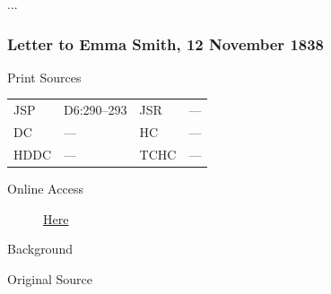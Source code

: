 					\begin{tightright}
					...
					\end{tightright}
					
		\subsubsection{Letter to Emma Smith, 12 November 1838}
			\label{EMS-1838-JS-12-NOV-1838}
			
			\begin{description}
					\item[Print Sources]
				\end{description}

					\begin{tabular}{p{0.5in}p{1in}p{0.5in}p{1in}}
					JSP	 	& D6:290--293		& JSR 		& --- \\
					DC	 	& ---		& HC 		& --- \\
					HDDC 	& ---		& TCHC 		& --- \\
					\end{tabular}
				
				\begin{description}
					\item[Online Access] \href{https://www.josephsmithpapers.org/paper-summary/letter-to-emma-smith-12-november-1838/1}{Here}
				\end{description}
				
				\begin{description}
					\item[Background]
				\end{description}
				
				
				\begin{description}
					\item[Original Source]
				\end{description}
				
					
